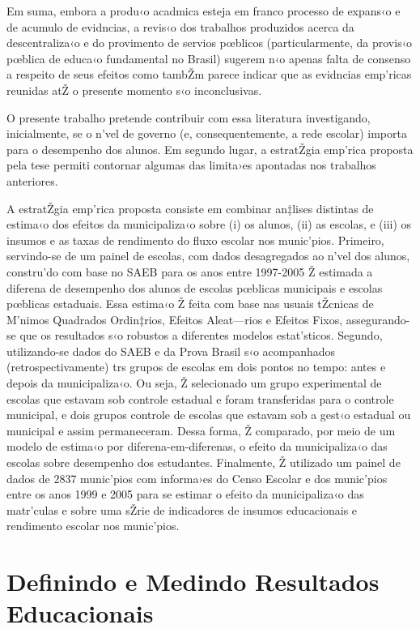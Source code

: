 \documentclass[a4paper, 12pt]{article}
\begin{document}
Em suma, embora a produ‹o acadmica esteja em franco processo de expans‹o e de acumulo de evidncias, a revis‹o dos trabalhos produzidos acerca da descentraliza‹o e do provimento de servios pœblicos (particularmente, da provis‹o pœblica de educa‹o fundamental no Brasil) sugerem n‹o apenas falta de consenso a respeito de seus efeitos como tambŽm parece indicar que as evidncias emp’ricas reunidas atŽ o presente momento s‹o inconclusivas.

O presente trabalho pretende contribuir com essa literatura investigando, inicialmente, se o n’vel de governo (e, consequentemente, a rede escolar) importa para o desempenho dos alunos. Em segundo lugar, a estratŽgia emp’rica proposta pela tese permiti contornar algumas das limita›es apontadas nos trabalhos anteriores.

A estratŽgia emp’rica proposta consiste em combinar an‡lises distintas de estima‹o dos efeitos da municipaliza‹o sobre (i) os alunos, (ii) as escolas, e (iii) os insumos e as taxas de rendimento do fluxo escolar nos munic’pios. Primeiro, servindo-se de um painel de escolas, com dados desagregados ao n’vel dos alunos, constru’do com base no SAEB para os anos entre 1997-2005 Ž estimada a diferena de desempenho dos alunos de escolas pœblicas municipais e escolas pœblicas estaduais. Essa estima‹o Ž feita com base nas usuais tŽcnicas de M’nimos Quadrados Ordin‡rios, Efeitos Aleat—rios e Efeitos Fixos, assegurando-se que os resultados s‹o robustos a diferentes modelos estat’sticos. Segundo, utilizando-se dados do SAEB e da Prova Brasil s‹o acompanhados (retrospectivamente) trs grupos de escolas em dois pontos no tempo: antes e depois da municipaliza‹o. Ou seja, Ž selecionado um grupo experimental de escolas que estavam sob controle estadual e foram transferidas para o controle municipal, e dois grupos controle de escolas que estavam sob a gest‹o estadual ou municipal e assim permaneceram. Dessa forma, Ž comparado, por meio de um modelo de estima‹o por diferena-em-diferenas, o efeito da municipaliza‹o das escolas sobre desempenho dos estudantes. Finalmente, Ž utilizado um painel de dados de 2837 munic’pios com informa›es do Censo Escolar e dos munic’pios entre os anos 1999 e 2005 para se estimar o efeito da municipaliza‹o das matr’culas e sobre uma sŽrie de indicadores de insumos educacionais e rendimento escolar nos munic’pios.

\pagebreak

\section{Definindo e Medindo Resultados Educacionais}
\end{document}

